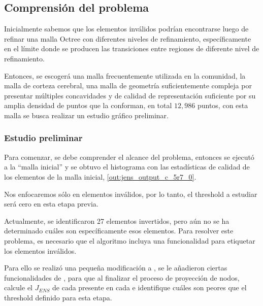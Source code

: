 
\subsection{Comprensión del problema}

Inicialmente sabemos que los elementos inválidos podrían encontrarse luego de refinar una malla Octree con diferentes niveles de refinamiento, específicamente en el límite donde se producen las transiciones entre regiones de diferente nivel de refinamiento.

Entonces, se escogerá una malla frecuentemente utilizada en la comunidad, la malla de corteza cerebral, una malla de geometría suficientemente compleja por presentar múltiples concavidades y de calidad de representación suficiente por su amplia densidad de puntos que la conforman, en total $12,986$ puntos, con esta malla se busca realizar un estudio gráfico preliminar.

\subsubsection{Estudio preliminar}

Para comenzar, se debe comprender el alcance del problema, entonces se ejecutó \jens{} a la ``malla inicial'' y se obtuvo el histograma con las estadísticas de calidad de los elementos de la malla inicial, \autoref{out:jens_output_c_5r7_0}.

Nos enfocaremos sólo en elementos inválidos, por lo tanto, el threshold a estudiar será cero en esta etapa previa.

Actualmente, se identificaron 27 elementos invertidos, pero aún no se ha determinado cuáles son específicamente esos elementos. Para resolver este problema, es necesario que el algoritmo \mesher{} incluya una funcionalidad para etiquetar los elementos inválidos.

Para ello se realizó una pequeña modificación a \mesher{}, se le añadieron ciertas funcionalidades de \jens{}, para que al finalizar el proceso de proyección de nodos, calcule el $J_{ENS}$ de cada \element{} presente en cada \octant{} e identifique cuáles son peores que el threshold definido para esta etapa.



